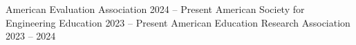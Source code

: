 

\begin{cvtable}
        {American Evaluation Association}
        {2024 -- Present}
        {}
    \cvitem{}
        {American Society for Engineering Education}
        {2023 -- Present}
        {}
    \cvitem{}
        {American Education Research Association}
        {2023 -- 2024}
        {}
\end{cvtable}